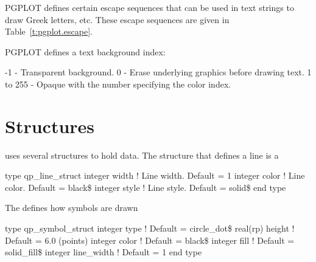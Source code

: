 PGPLOT defines certain escape sequences that can be used in text strings
to draw Greek letters, etc. These escape sequences are given in 
Table~\ref{t:pgplot.escape}.

PGPLOT defines a text background index:
\begin{example}
         -1 - Transparent background.
          0 - Erase underlying graphics before drawing text.
   1 to 255 - Opaque with the number specifying the color index.
\end{example}

\section{Structures}
\label{s:qp.structs}

\quickplot uses several structures to hold data. The structure that
defines a line is a 
\begin{example}
  type qp_line_struct
    integer width   ! Line width. Default = 1
    integer color   ! Line color. Default = black\$
    integer style   ! Line style. Default = solid\$
  end type
\end{example}

The  defines how symbols are drawn 
\begin{example}
  type qp_symbol_struct
    integer  type        ! Default = circle_dot\$
    real(rp) height      ! Default = 6.0 (points)
    integer  color       ! Default = black\$
    integer  fill        ! Default = solid_fill\$
    integer  line_width  ! Default = 1
  end type
\end{example}

